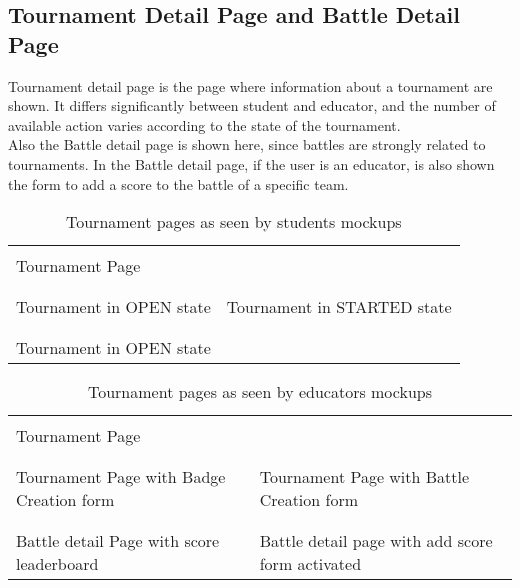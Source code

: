 \subsection{Tournament Detail Page and Battle Detail Page}
Tournament detail page is the page where information about a tournament are shown. It differs significantly between student and educator, and the number of available action varies according to the state of the tournament.\\
Also the Battle detail page is shown here, since battles are strongly related to tournaments. In the Battle detail page, if the user is an educator, is also shown the form to add a score to the battle of a specific team.\\
\clearpage
\begin{table}
    \begin{tabu}{X[c, .5] X[c, .5]} 
         & \\
        Tournament Page & \\
        & \\
         &  \\
        Tournament in OPEN state & Tournament in STARTED state \\
        & \\
         & \\
        Tournament in OPEN state & \\
    \end{tabu}
    \caption{Tournament pages as seen by students mockups}
\end{table}
\begin{table}
    \begin{tabu}{X[c, .5] X[c, .5]} 
         &  \\
        Tournament Page & \\
        & \\
         &  \\
        Tournament Page with Badge Creation form & Tournament Page with Battle Creation form\\
        & \\
         &  \\
        Battle detail Page with score leaderboard & Battle detail page with add score form activated\\
    \end{tabu}
    \caption{Tournament pages as seen by educators mockups}
\end{table}
\clearpage
